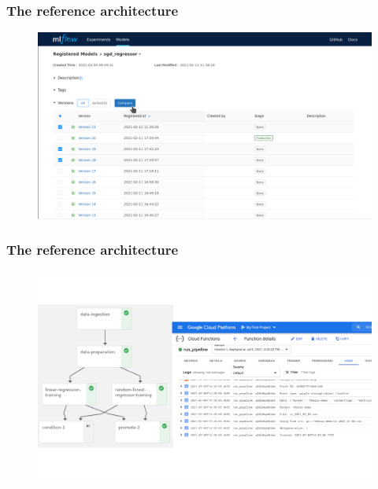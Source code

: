 \documentclass{beamer}
\begin{document}
\begin{frame}
\frametitle{The reference architecture}
\begin{figure}
\includegraphics[scale=0.35]{figure/mlflow_model_versioning.png}
\end{figure}

\end{frame}

\begin{frame}
\frametitle{The reference architecture}
\begin{figure}
\includegraphics[scale=0.8]{figure/kubeflow_pipeline_gcf.png}
\end{figure}

\end{frame}
\end{document}
